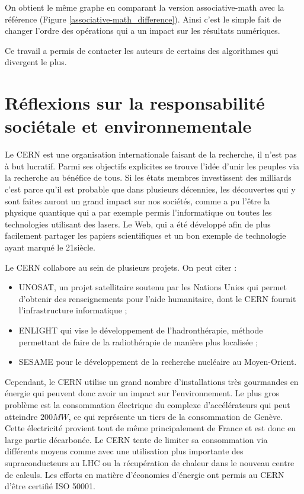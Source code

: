 \documentclass[a4paper,11pt]{report}
\begin{document}
On obtient le même graphe en comparant la version associative-math avec la référence (Figure \ref{associative-math_difference}).
Ainsi c'est le simple fait de changer l'ordre des opérations qui a un impact sur les résultats numériques.

Ce travail a permis de contacter les auteurs de certains des algorithmes qui divergent le plus.

\section{Réflexions sur la responsabilité sociétale et environnementale}
Le CERN est une organisation internationale faisant de la recherche, il n'est pas à but lucratif.
Parmi ses objectifs explicites se trouve l'idée d'unir les peuples via la recherche au bénéfice de tous.
Si les états membres investissent des milliards c'est parce qu'il est probable que dans plusieurs décennies, les découvertes qui y sont faites auront un grand impact sur nos sociétés,
comme a pu l'être la physique quantique qui a par exemple permis l'informatique ou toutes les technologies utilisant des lasers.
Le Web, qui a été développé afin de plus facilement partager les papiers scientifiques et un bon exemple de technologie ayant marqué le 21\ieme siècle.

Le CERN collabore au sein de plusieurs projets. On peut citer :
\begin{itemize}
    \item UNOSAT, un projet satellitaire soutenu par les Nations Unies qui permet d'obtenir des renseignements pour l'aide humanitaire, dont le CERN fournit l'infrastructure informatique ;
    \item ENLIGHT qui vise le développement de l'hadronthérapie, méthode permettant de faire de la radiothérapie de manière plus localisée ;
    \item SESAME pour le développement de la recherche nucléaire au Moyen-Orient.
\end{itemize}

Cependant, le CERN utilise un grand nombre d'installations très gourmandes en énergie qui peuvent donc avoir un impact sur l'environnement.
Le plus gros problème est la consommation électrique du complexe d'accélérateurs qui peut atteindre $200MW$, ce qui représente un tiers de la consommation de Genève.
Cette électricité provient tout de même principalement de France et est donc en large partie décarbonée.
Le CERN tente de limiter sa consommation via différents moyens comme avec une utilisation plus importante des supraconducteurs au LHC ou la récupération de chaleur dans le nouveau centre de calculs.
Les efforts en matière d'économies d'énergie ont permis au CERN d'être certifié ISO 50001.
\end{document}
